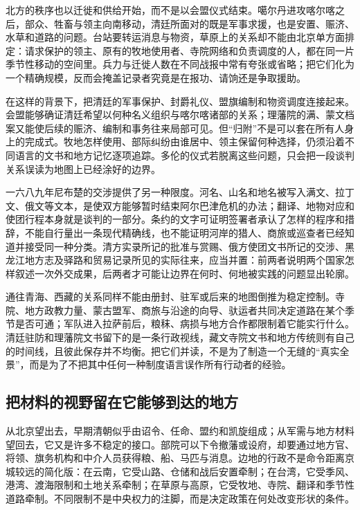 北方的秩序也以迁徙和供给开始，而不是以会盟仪式结束。噶尔丹进攻喀尔喀之后，部众、牲畜与领主向南移动，清廷所面对的既是军事求援，也是安置、赈济、水草和道路的问题。台站要转运消息与物资，草原上的关系却不能由北京单方面排定：请求保护的领主、原有的牧地使用者、寺院网络和负责调度的人，都在同一片季节性移动的空间里。兵力与迁徙人数在不同战报中常有夸张或省略；把它们化为一个精确规模，反而会掩盖记录者究竟是在报功、请饷还是争取援助。

在这样的背景下，把清廷的军事保护、封爵礼仪、盟旗编制和物资调度连接起来。会盟能够确证清廷希望以何种名义组织与喀尔喀诸部的关系；理藩院的满、蒙文档案又能使后续的赈济、编制和事务往来局部可见。但“归附”不是可以套在所有人身上的完成式。牧地怎样使用、部际纠纷由谁居中、领主保留何种选择，仍须沿着不同语言的文书和地方记忆逐项追踪。多伦的仪式若脱离这些问题，只会把一段谈判关系误读为地图上已经涂好的边界。

一六八九年尼布楚的交涉提供了另一种限度。河名、山名和地名被写入满文、拉丁文、俄文等文本，是使双方能够暂时结束阿尔巴津危机的办法；翻译、地物对应和使团行程本身就是谈判的一部分。条约的文字可证明签署者承认了怎样的程序和措辞，不能自行量出一条现代精确线，也不能证明河岸的猎人、商旅或巡查者已经知道并接受同一种分类。清方实录所记的批准与赏赐、俄方使团文书所记的交涉、黑龙江地方志及驿路和贸易记录所见的实际往来，应当并置：前两者说明两个国家怎样叙述一次外交成果，后两者才可能让边界在何时、何地被实践的问题显出轮廓。

通往青海、西藏的关系同样不能由册封、驻军或后来的地图倒推为稳定控制。寺院、地方政教力量、蒙古盟军、商旅与沿途的向导、驮运者共同决定道路在某个季节是否可通；军队进入拉萨前后，粮秣、病损与地方合作都限制着它能实行什么。清廷驻防和理藩院文书留下的是一条行政视线，藏文寺院文书和地方传统则有自己的时间线，且彼此保存并不均衡。把它们并读，不是为了制造一个无缝的“真实全景”，而是为了不把其中任何一种制度语言误作所有行动者的经验。

\subsection{把材料的视野留在它能够到达的地方}

从北京望出去，早期清朝似乎由诏令、任命、盟约和凯旋组成；从军需与地方材料望回去，它又是许多不稳定的接口。部院可以下令撤藩或设府，却要通过地方官、将领、旗务机构和中介人员获得粮、船、马匹与消息。边地的行政不是命令距离京城较远的简化版：在云南，它受山路、仓储和战后安置牵制；在台湾，它受季风、港湾、渡海限制和土地关系牵制；在草原与高原，它受牧地、寺院、翻译和季节性道路牵制。不同限制不是中央权力的注脚，而是决定政策在何处改变形状的条件。

